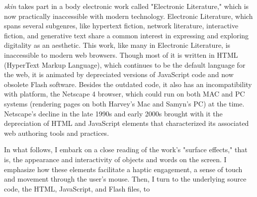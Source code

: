 \documentclass[11pt]{article}
\begin{document}
\emph{skin} takes part in a body electronic work called "Electronic
Literature," which is now practically inaccessible with modern
technology. Electronic Literature, which spans several subgenres, like
hypertext fiction, network literature, interactive fiction, and
generative text share a common interest in expressing and exploring
digitality as an aesthetic. This work, like many in Electronic
Literature, is inaccessible to modern web browsers. Though most of it
is written in HTML (HyperText Markup Language), which continues to be
the default language for the web, it is animated by depreciated
versions of JavaScript code and now obsolete Flash software. Besides
the outdated code, it also has an incompatibility with platform, the
Netscape 4 browser, which could run on both MAC and PC systems
(rendering pages on both Harvey's Mac and Samyn's PC) at the
time. Netscape's decline in the late 1990s and early 2000s brought
with it the depreciation of HTML and JavaScript elements that
characterized its associated web authoring tools and practices.

In what follows, I embark on a close reading of the work's "surface
effects," that is, the appearance and interactivity of objects and
words on the screen. I emphasize how these elements facilitate a
haptic engagement, a sense of touch and movement through the user's
mouse. Then, I turn to the underlying source code, the HTML,
JavaScript, and Flash files, to 
\end{document}
